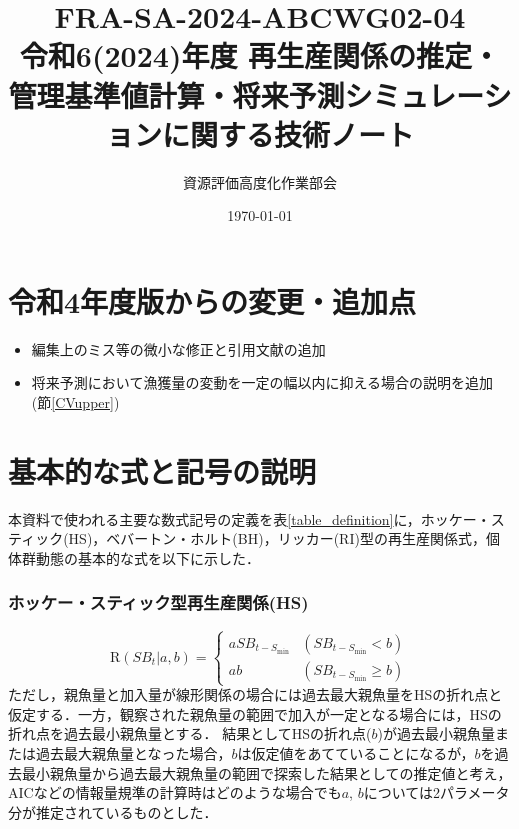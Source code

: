 \documentclass[11pt]{jsarticle}
\begin{document}
\title{{\large FRA-SA-2024-ABCWG02-04} \\
  令和6(2024)年度 再生産関係の推定・管理基準値計算・将来予測シミュレーションに関する技術ノート 
}
\author{資源評価高度化作業部会}
\date{\today}
\maketitle

\section{令和4年度版からの変更・追加点}
\begin{itemize}
\item 編集上のミス等の微小な修正と引用文献の追加
\item 将来予測において漁獲量の変動を一定の幅以内に抑える場合の説明を追加(節\ref{CVupper})
\end{itemize}

\section{基本的な式と記号の説明}
本資料で使われる主要な数式記号の定義を表\ref{table_definition}に，ホッケー・スティック(HS)\cite{hockey}，ベバートン・ホルト(BH)\cite{beverton}，リッカー(RI)\cite{ricker}型の再生産関係式，個体群動態の基本的な式を以下に示した． 

\subsubsection*{ホッケー・スティック型再生産関係(HS)}
\begin{equation}
  \mathrm{R}(S\!B_{t}|a,b)=\begin{cases}
    a  S\!B_{t-S_{\mathrm{min}}} & (S\!B_{t-S_{\mathrm{min}}} < b) \\
    a  b                 & (S\!B_{t-S_{\mathrm{min}}} \geq b)
  \end{cases}
  \label{HS}
\end{equation}
ただし，親魚量と加入量が線形関係の場合には過去最大親魚量をHSの折れ点と仮定する．一方，観察された親魚量の範囲で加入が一定となる場合には，HSの折れ点を過去最小親魚量とする．
結果としてHSの折れ点($b$)が過去最小親魚量または過去最大親魚量となった場合，$b$は仮定値をあてていることになるが，$b$を過去最小親魚量から過去最大親魚量の範囲で探索した結果としての推定値と考え，AICなどの情報量規準の計算時はどのような場合でも$a$, $b$については2パラメータ分が推定されているものとした．
\end{document}
